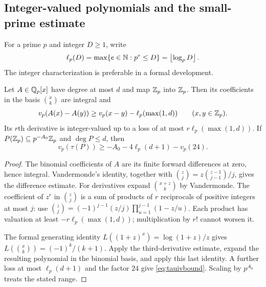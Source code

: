 \subsection{Integer-valued polynomials and the small-prime estimate}
For a prime $p$ and integer $D\ge1$, write
\[
 \ell_p(D)=\max\{e\in\mathbb N:p^e\le D\}=\left\lfloor \log_p D\right\rfloor.
\]
The integer characterization is preferable in a formal development.

\begin{lemma}
\label{lem:integervalued}
Let $A\in\mathbb Q_p[x]$ have degree at most $d$ and map $\mathbb Z_p$ into $\mathbb Z_p$.
Then its coefficients in the basis $\binom{x}{k}$ are integral and
\[
 v_p(A(x)-A(y))\ge v_p(x-y)-\ell_p(\max(1,d))\qquad(x,y\in\mathbb Z_p).
\]
Its $r$th derivative is integer-valued up to a loss of at most
$r\ell_p(\max(1,d))$. If $P(\mathbb Z_p)\subseteq p^{-A_0}\mathbb Z_p$ and
$\deg P\le d$, then
\begin{equation}\label{eq:tauivbound}
 v_p(\tau(P))\ge-A_0-4\ell_p(d+1)-v_p(24).
\end{equation}
\end{lemma}
\begin{proof}
The binomial coefficients of $A$ are its finite forward differences at
zero, hence integral. Vandermonde's identity, together with
$\binom{z}{j}=z\binom{z-1}{j-1}/j$, gives the difference estimate.
For derivatives expand $\binom{x+z}{k}$ by Vandermonde. The coefficient
of $z^r$ in $\binom zj$ is a sum of products of $r$ reciprocals of
positive integers at most $j$: use
$\binom zj=(-1)^{j-1}(z/j)\prod_{u=1}^{j-1}(1-z/u)$.
Each product has valuation at least $-r\ell_p(\max(1,d))$; multiplication
by $r!$ cannot worsen it.

The formal generating identity
$L((1+z)^x)=\log(1+z)/z$ gives
$L(\binom{x}{k})=(-1)^k/(k+1)$. Apply the third-derivative estimate,
expand the resulting polynomial in the binomial basis, and apply this
last identity. A further loss at most $\ell_p(d+1)$ and the factor $24$
give \eqref{eq:tauivbound}. Scaling by $p^{A_0}$ treats the stated range.
\end{proof}

